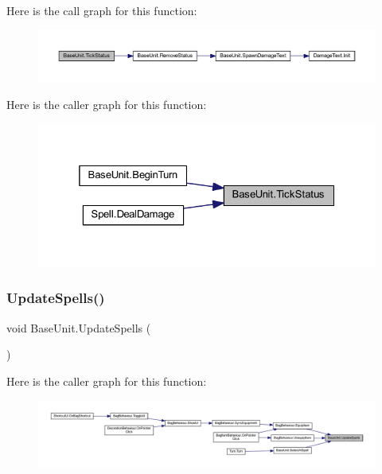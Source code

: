 Here is the call graph for this function\+:\nopagebreak
\begin{figure}[H]
\begin{center}
\leavevmode
\includegraphics[width=350pt]{class_base_unit_af140c1094709a0a90f84d52a4ee80d90_cgraph}
\end{center}
\end{figure}
Here is the caller graph for this function\+:\nopagebreak
\begin{figure}[H]
\begin{center}
\leavevmode
\includegraphics[width=325pt]{class_base_unit_af140c1094709a0a90f84d52a4ee80d90_icgraph}
\end{center}
\end{figure}
\mbox{\label{class_base_unit_a8b9c4263f81ef40c1841d26ee0573bce}} 
\subsubsection{\texorpdfstring{UpdateSpells()}{UpdateSpells()}}
{\footnotesize\ttfamily void Base\+Unit.\+Update\+Spells (\begin{DoxyParamCaption}{ }\end{DoxyParamCaption})}

Here is the caller graph for this function\+:\nopagebreak
\begin{figure}[H]
\begin{center}
\leavevmode
\includegraphics[width=350pt]{class_base_unit_a8b9c4263f81ef40c1841d26ee0573bce_icgraph}
\end{center}
\end{figure}


